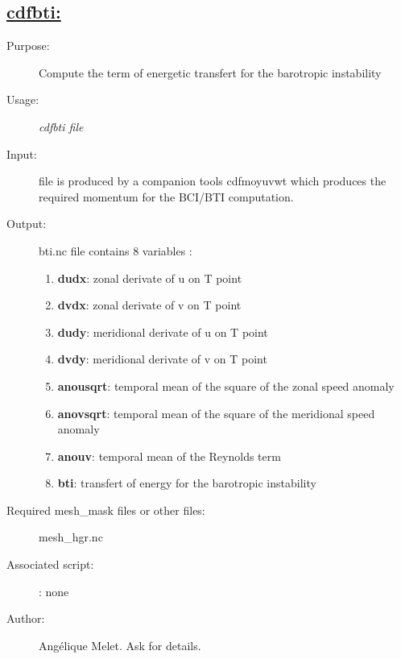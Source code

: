\documentclass[a4paper,11pt]{article}
\begin{document}
\subsection*{\underline{cdfbti:}}
\begin{description}
\item[Purpose:] Compute the term of energetic transfert for the barotropic instability 
\item[Usage:] {\em cdfbti  file }
\item[Input:] file is produced by a companion tools cdfmoyuvwt which produces the required momentum for the BCI/BTI computation.
\item[Output:] bti.nc file contains 8 variables : 
     \begin{enumerate} 
        \item {\bf dudx}:  zonal derivate of u on T point
        \item {\bf dvdx}: zonal derivate of v on T point
        \item {\bf dudy}:  meridional derivate of u on T point
        \item {\bf dvdy}: meridional derivate of v on T point
        \item {\bf anousqrt}: temporal mean of the square of the zonal speed anomaly
        \item {\bf anovsqrt}: temporal mean of the square of the meridional speed anomaly
        \item {\bf anouv}: temporal mean of the Reynolds term
        \item {\bf bti}: transfert of energy for the barotropic instability 
      \end{enumerate}
\item[Required mesh\_mask files or other files:] mesh\_hgr.nc
\item[Associated script:] : none
\item[Author:] Ang\'elique Melet. Ask for details.
\end{description}
\end{document}
